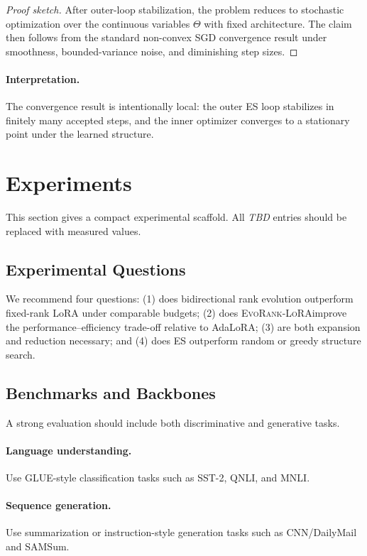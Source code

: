 \documentclass{article}
\newcommand{\method}{\textsc{EvoRank-LoRA}}
\newcommand{\TODO}{\textit{TBD}}
\begin{document}
\begin{proof}[Proof sketch]
After outer-loop stabilization, the problem reduces to stochastic optimization over the continuous variables $\Theta$ with fixed architecture. The claim then follows from the standard non-convex SGD convergence result under smoothness, bounded-variance noise, and diminishing step sizes.
\end{proof}

\paragraph{Interpretation.}
The convergence result is intentionally local: the outer ES loop stabilizes in finitely many accepted steps, and the inner optimizer converges to a stationary point under the learned structure.

\section{Experiments}
\label{sec:exp}

This section gives a compact experimental scaffold. All \TODO{} entries should be replaced with measured values.

\subsection{Experimental Questions}
We recommend four questions: (1) does bidirectional rank evolution outperform fixed-rank LoRA under comparable budgets; (2) does \method improve the performance--efficiency trade-off relative to AdaLoRA; (3) are both expansion and reduction necessary; and (4) does ES outperform random or greedy structure search.

\subsection{Benchmarks and Backbones}
A strong evaluation should include both discriminative and generative tasks.
\paragraph{Language understanding.}
Use GLUE-style classification tasks such as SST-2, QNLI, and MNLI.
\paragraph{Sequence generation.}
Use summarization or instruction-style generation tasks such as CNN/DailyMail and SAMSum.
\end{document}
